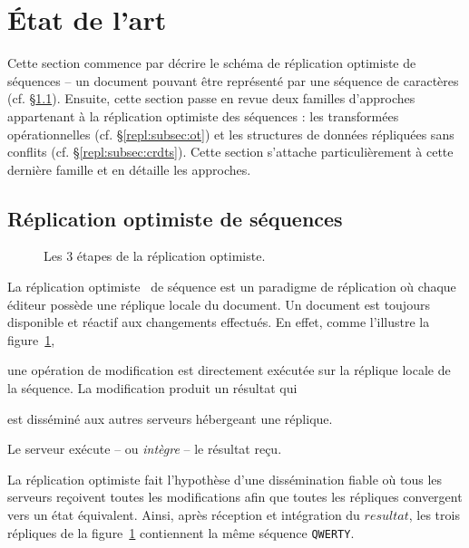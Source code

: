 

\section{État de l'art}
\label{repl:sec:stateoftheart}

Cette section commence par décrire le schéma de réplication optimiste de
séquences -- un document pouvant être représenté par une séquence de caractères
(cf. §\ref{repl:subsec:optimistic}).  Ensuite, cette section passe en revue deux
familles d'approches appartenant à la réplication optimiste des séquences : les
transformées opérationnelles (cf. §\ref{repl:subsec:ot}) et les structures de
données répliquées sans conflits (cf. §\ref{repl:subsec:crdts}). Cette section
s'attache particulièrement à cette dernière famille et en détaille les
approches.

\subsection{Réplication optimiste de séquences}
\label{repl:subsec:optimistic}

\begin{figure}
  \begin{center}
    
    \caption[Étapes de la réplication
    optimiste]{\label{repl:fig:optimisticsteps} Les 3 étapes de la réplication
      optimiste.}    
  \end{center}
\end{figure}

La réplication optimiste~\cite{demers1987epidemic, johnson1975maintenance,
  ladin1992providing, saito2005optimistic} de séquence est un paradigme de
réplication où chaque éditeur possède une réplique locale du document.  Un
document est toujours disponible et réactif aux changements effectués. En effet,
comme l'illustre la figure~\ref{repl:fig:optimisticsteps},
\begin{inparaenum}[(a)]
\item une opération de modification est directement exécutée sur la réplique
  locale de la séquence.  La modification produit un résultat qui
\item est disséminé aux autres serveurs hébergeant une réplique.
\item Le serveur exécute -- ou \emph{intègre} -- le résultat reçu.
\end{inparaenum}


\noindent La réplication optimiste fait l'hypothèse d'une dissémination fiable
où tous les serveurs reçoivent toutes les modifications afin que toutes les
répliques convergent vers un état équivalent. Ainsi, après réception et
intégration du $resultat$, les trois répliques de la
figure~\ref{repl:fig:optimisticsteps} contiennent la même séquence
\texttt{QWERTY}.

